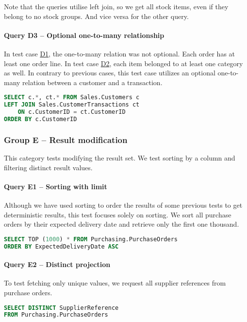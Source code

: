 Note that the queries utilise left join, so we get all stock items, even if they belong to no stock groups. And vice versa for the other query.

\paragraph{Query D3 -- Optional one-to-many relationship}
\label{query:d3}
In test case \hyperref[query:d1]{D1}, the one-to-many relation was not optional. Each order has at least one order line. In test case \hyperref[query:d2]{D2}, each item belonged to at least one category as well. In contrary to previous cases, this test case utilizes an optional one-to-many relation between a customer and a transaction. 

\begin{lstlisting}[language=SQL]
SELECT c.*, ct.* FROM Sales.Customers c
LEFT JOIN Sales.CustomerTransactions ct
    ON c.CustomerID = ct.CustomerID
ORDER BY c.CustomerID
\end{lstlisting}

\subsubsection{Group E -- Result modification}
This category tests modifying the result set. We test sorting by a column and filtering distinct result values.

\paragraph{Query E1 -- Sorting with limit}
\label{query:e1}
Although we have used sorting to order the results of some previous tests to get deterministic results, this test focuses solely on sorting.
We sort all purchase orders by their expected delivery date and retrieve only the first one thousand.

\begin{lstlisting}[language=SQL]
SELECT TOP (1000) * FROM Purchasing.PurchaseOrders 
ORDER BY ExpectedDeliveryDate ASC
\end{lstlisting}

\paragraph{Query E2 -- Distinct projection}
\label{query:e2}
To test fetching only unique values, we request all supplier references from purchase orders.

\begin{lstlisting}[language=SQL]
SELECT DISTINCT SupplierReference 
FROM Purchasing.PurchaseOrders
\end{lstlisting}

